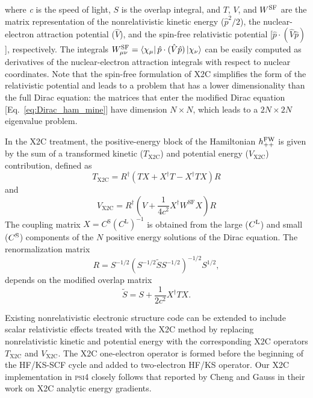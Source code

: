 \documentclass{article}
\begin{document}
where \textit{c} is the speed of light,  $S$ is the overlap integral, and $T$, $V$, and $W^{\rm SF}$ are the matrix representation of the nonrelativistic kinetic energy ($\hat{p}^2/2$), the nuclear-electron attraction potential ($\hat{V}$), and the spin-free relativistic potential [$\hat{p}\cdot (\hat{V}\hat{p})$], respectively.
The integrals $W^{\rm SF}_{\mu\nu} = \bra{\chi_\mu} \hat{p}\cdot (\hat{V}\hat{p}) \ket{\chi_\nu}$ can be easily computed as derivatives of the nuclear-electron attraction integrals with respect to nuclear coordinates.
Note that the spin-free formulation of X2C simplifies the form of the relativistic potential and leads to a problem that has a lower dimensionality than the full Dirac equation: the matrices that enter the modified Dirac equation  [Eq.~\eqref{eq:Dirac_ham_mine}] have dimension $N \times N$, which leads to a $2N \times 2N$ eigenvalue problem.

In the X2C treatment,\cite{Dyall-NESC,X2C-Dyall2001,Kutzelnigg-matrix1, llias, X2C-Liu2006,X2C-KUt-Liu2007,IOTC-trond,X2C-Liu2007,X2C-Liu2009}  the positive-energy block of the Hamiltonian $h^{\rm FW}_{++}$ is given by the sum of a transformed kinetic ($T_{\text{X2C}}$) and potential energy ($V_{\text{X2C}}$) contribution, defined as
\begin{equation}
	T_{\text{X2C}}= R^{\dagger} (TX +  {X}^{\dagger}T - {X}^{\dagger}TX ) R 
	\label{eq:TQrel}
\end{equation}
and
\begin{equation}
	V_{\text{X2C}} =  R^{\dagger}(V + \frac{1}{4c^2} X^{\dagger}W^{\text{SF}}X) R
	\label{eq:VQrel}
\end{equation}
The coupling matrix ${X} = C^{\text{S}} (C^{\text{L}})^{-1}$ is obtained from the large ($C^{\rm L}$) and small ($C^{\rm S}$) components of the $N$ positive energy solutions of the Dirac equation.
The renormalization matrix\cite{X2C-Liu2009} 
\begin{equation}
{R}=S^{-1/2}(S^{-1/2}\tilde{S}S^{-1/2})^{-1/2}S^{1/2},
\end{equation}
depends on the modified overlap matrix
\begin{equation}
\tilde{S}=S+\frac{1}{2c^2}X^{\dagger}TX.
\end{equation}

Existing nonrelativistic electronic structure code can be extended to include scalar relativistic effects treated with the X2C method by replacing nonrelativistic kinetic and potential energy with the corresponding X2C operators $T_{\text{X2C}}$ and $V_{\text{X2C}}$. 
The X2C one-electron operator is formed before the beginning of the HF/KS-SCF cycle and added to two-electron HF/KS operator. Our X2C implementation in \textsc{psi4} closely follows that reported by Cheng and Gauss\cite{Lan-X2C} in their work on X2C analytic energy gradients.
 
\end{document}
